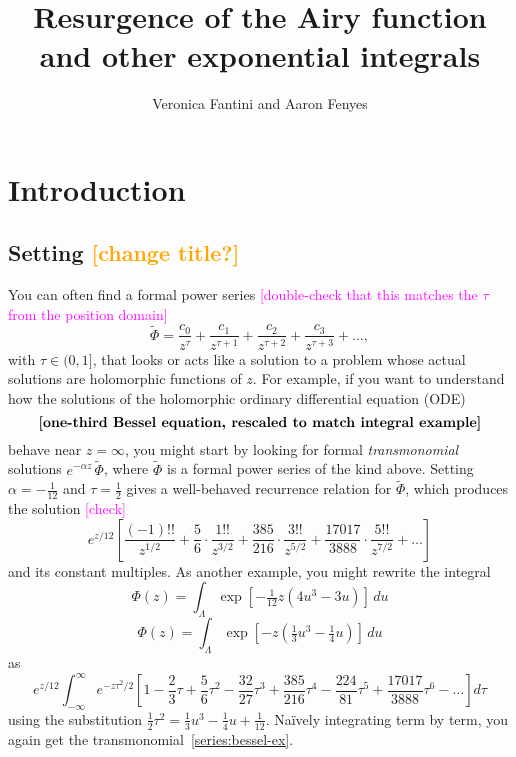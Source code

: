 \documentclass{article}
\title{Resurgence of the Airy function \\ and other exponential integrals}
\author{Veronica Fantini and Aaron Fenyes}
\newcommand{\series}{\tilde}
\begin{document}
\maketitle
\section{Introduction}
\subsection{Setting \textcolor{orange}{[change title?]}}
You can often find a formal power series \textcolor{magenta}{[double-check that this matches the $\tau$ from the position domain]}
\[ \series{\Phi} = \frac{c_0}{z^\tau} + \frac{c_1}{z^{\tau+1}} + \frac{c_2}{z^{\tau+2}} + \frac{c_3}{z^{\tau+3}} + \ldots, \]
with $\tau \in (0, 1]$, that looks or acts like a solution to a problem whose actual solutions are holomorphic functions of $z$. For example, if you want to understand how the solutions of the holomorphic ordinary differential equation (ODE)
\begin{equation}
\text{\bf [one-third Bessel equation, rescaled to match integral example]} \label{eqn:bessel-rescaled}
\end{equation}
behave near $z = \infty$, you might start by looking for formal {\em transmonomial} solutions $e^{-\alpha z}\,\series{\Phi}$, where $\series{\Phi}$ is a formal power series of the kind above. Setting $\alpha = -\tfrac{1}{12}$ and $\tau = \tfrac{1}{2}$ gives a well-behaved recurrence relation for $\series{\Phi}$, which produces the solution \textcolor{magenta}{[check]}
\begin{equation}
e^{z/12} \left[ \frac{(-1)!!}{z^{1/2}} + \frac{5}{6} \cdot \frac{1!!}{z^{3/2}} + \frac{385}{216} \cdot \frac{3!!}{z^{5/2}} + \frac{17017}{3888} \cdot \frac{5!!}{z^{7/2}} + \ldots \right] \label{series:bessel-ex}
\end{equation}
and its constant multiples. As another example, you might rewrite the integral
\color{DodgerBlue}
\[ \Phi(z) = \int_{\Lambda} \exp\left[-\tfrac{1}{12} z \left(4u^3 - 3u\right)\right]\,du \]
\color{black}
\[ \Phi(z) = \int_{\Lambda} \exp\left[-z \left(\tfrac{1}{3} u^3 - \tfrac{1}{4} u\right)\right]\,du \]
as
\[ e^{z/12} \int_{-\infty}^\infty e^{-z\tau^2/2} \left[ 1 - \frac{2}{3} \tau + \frac{5}{6} \tau^2 - \frac{32}{27} \tau^3 + \frac{385}{216} \tau^4 - \frac{224}{81} \tau^5 + \frac{17017}{3888} \tau^6 - \ldots \right] d\tau \]
using the substitution $\tfrac{1}{2} \tau^2 = \tfrac{1}{3} u^3 - \tfrac{1}{4} u + \tfrac{1}{12}$. Na\"{i}vely integrating term by term, you again get the transmonomial~\eqref{series:bessel-ex}.
\end{document}
